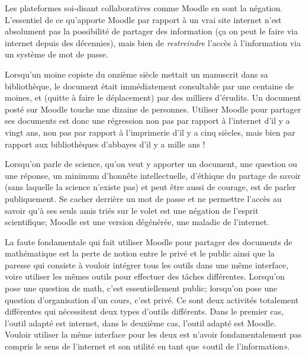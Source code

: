 Les plateformes soi-disant collaboratives comme Moodle en sont la négation. L'essentiel de ce qu'apporte Moodle par rapport à un vrai site internet n'est absolument pas la possibilité de partager des information (ça on peut le faire via internet depuis des décennies), mais bien de \emph{restreindre} l'accès à l'information via un système de mot de passe.

Lorsqu'un moine copiste du onzième siècle mettait un manuscrit dans sa bibliothèque, le document était immédiatement consultable par une centaine de moines, et (quitte à faire le déplacement) par des milliers d'érudits. Un document posté sur Moodle touche une dizaine de personnes. Utiliser Moodle pour partager ses documents est donc une régression non pas par rapport à l'internet d'il y a vingt ans, non pas par rapport à l'imprimerie d'il y a cinq siècles, mais bien par rapport aux bibliothèques d'abbayes d'il y a mille ans !

Lorsqu'on parle de science, qu'on veut y apporter un document, une question ou une réponse, un minimum d'honnête intellectuelle, d'éthique du partage de savoir (sans laquelle la science n'existe pas) et peut être aussi de courage, est de parler publiquement. Se cacher derrière un mot de passe et ne permettre l'accès au savoir qu'à ses seuls amis triés sur le volet est une négation de l'esprit scientifique; Moodle est une version dégénérée, une maladie de l'internet.

La faute fondamentale qui fait utiliser Moodle pour partager des documents de mathématique est la perte de notion entre le privé et le public ainsi que la paresse qui consiste à vouloir intégrer tous les outils dans une même interface, voire utiliser les mêmes outils pour effectuer des tâches différentes. Lorsqu'on pose une question de math, c'est essentiellement public; lorsqu'on pose une question d'organisation d'un cours, c'est privé. Ce sont deux activités totalement différentes qui nécessitent deux types d'outils différents. Dans le premier cas, l'outil adapté est internet, dans le deuxième cas, l'outil adapté est Moodle. Vouloir utiliser la même interface pour les deux est n'avoir fondamentalement pas compris le sens de l'internet et son utilité en tant que «outil de l'information».



